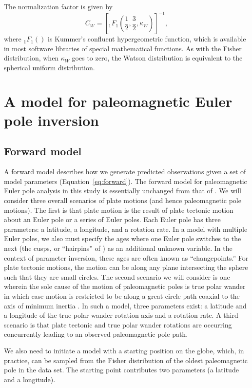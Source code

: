 \documentclass[11pt,letterpaper]{article}
\begin{document}
The normalization factor is given by
\begin{equation}
  C_W = \left[ {}_1 F_1 \left( \frac{1}{2}, \frac{3}{2}, \kappa_W \right) \right]^{-1},
\end{equation}
where ${}_1 F_1()$ is Kummer's confluent hypergeometric function, which is available in most software libraries of special mathematical functions. As with the Fisher distribution, when $\kappa_W$ goes to zero,  the Watson distribution is equivalent to the spherical uniform distribution.

\section*{A model for paleomagnetic Euler pole inversion}
\label{sec:model}
\subsection*{Forward model}
\label{sec:forward_model}
A forward model describes how we generate predicted observations given a set of model parameters (Equation~\eqref{eq:forward}). The forward model for paleomagnetic Euler pole analysis in this study is essentially unchanged from that of \cite{Gordon1984a}. We will consider three overall scenarios of plate motions (and hence paleomagnetic pole motions). The first is that plate motion is the result of plate tectonic motion about an Euler pole or a series of Euler poles. Each Euler pole has three parameters: a latitude, a longitude, and a rotation rate. In a model with multiple Euler poles, we also must specify the ages where one Euler pole switches to the next (the cusps, or ``hairpins'' of \cite{Irving1972a}) as an additional unknown variable. In the context of parameter inversion, these ages are often known as ``changepoints.'' For plate tectonic motions, the motion can be along any plane intersecting the sphere such that they are small circles. The second scenario we will consider is one wherein the sole cause of the motion of paleomagnetic poles is true polar wander in which case motion is restricted to be along a great circle path coaxial to the axis of minimum inertia \cite{Creveling2012a}. In such a model, three parameters exist: a latitude and a longitude of the true polar wander rotation axis and a rotation rate.  A third scenario is that plate tectonic and true polar wander rotations are occurring concurrently leading to an observed paleomagnetic pole path. 

We also need to initiate a model with a starting position on the globe, which, in practice, can be sampled from the Fisher distribution of the oldest paleomagnetic pole in the data set. The starting point contributes two parameters (a latitude and a longitude). 
\end{document}
